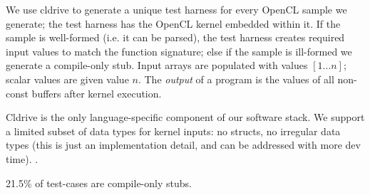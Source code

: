 We use cldrive to generate a unique test harness for every OpenCL sample we generate; the test harness has the OpenCL kernel embedded within it. If the sample is well-formed (i.e. it can be parsed), the test harness creates required input values to match the function signature; else if the sample is ill-formed we generate a compile-only stub. Input arrays are populated with values {$[1 \ldots n]$}; scalar values are given value $n$. The \emph{output} of a program is the values of all non-const buffers after kernel execution.

Cldrive is the only language-specific component of our software stack. We support a limited subset of data types for kernel inputs: no structs, no irregular data types (this is just an implementation detail, and can be addressed with more dev time). .

21.5\% of test-cases are compile-only stubs.